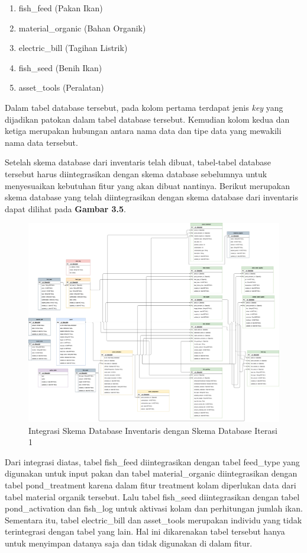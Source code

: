 \begin{enumerate}
\begin{enumerate}
		\begin{enumerate}
			\item fish\_feed (Pakan Ikan)
			\item material\_organic (Bahan Organik)
			\item electric\_bill (Tagihan Listrik)
			\item fish\_seed (Benih Ikan)
			\item asset\_tools (Peralatan)
		\end{enumerate}
	
		Dalam tabel database tersebut, pada kolom pertama terdapat jenis \textit{key} yang dijadikan patokan dalam tabel database tersebut. Kemudian kolom kedua dan ketiga merupakan hubungan antara nama data dan tipe data yang mewakili nama data tersebut.
	
		Setelah skema database dari inventaris telah dibuat, tabel-tabel database tersebut harus diintegrasikan dengan skema database sebelumnya untuk menyesuaikan kebutuhan fitur yang akan dibuat nantinya. Berikut merupakan skema database yang telah diintegrasikan dengan skema database dari inventaris dapat dilihat pada \textbf{Gambar 3.5}.
	
		\begin{figure}[H]
			\centering
			\includegraphics[width=1\textwidth]{gambar/sprint1/sprint1_skema_database.png}
			\caption{Integrasi Skema Database Inventaris dengan Skema Database Iterasi 1}
		\end{figure}

		Dari integrasi diatas, tabel fish\_feed diintegrasikan dengan tabel feed\_type yang digunakan untuk input pakan dan tabel material\_organic diintegrasikan dengan tabel pond\_treatment karena dalam fitur treatment kolam diperlukan data dari tabel material organik tersebut. Lalu tabel fish\_seed diintegrasikan dengan tabel pond\_activation dan fish\_log untuk aktivasi kolam dan perhitungan jumlah ikan. Sementara itu, tabel electric\_bill dan asset\_tools merupakan individu yang tidak terintegrasi dengan tabel yang lain. Hal ini dikarenakan tabel tersebut hanya untuk menyimpan datanya saja dan tidak digunakan di dalam fitur.


\end{enumerate}
\end{enumerate}
